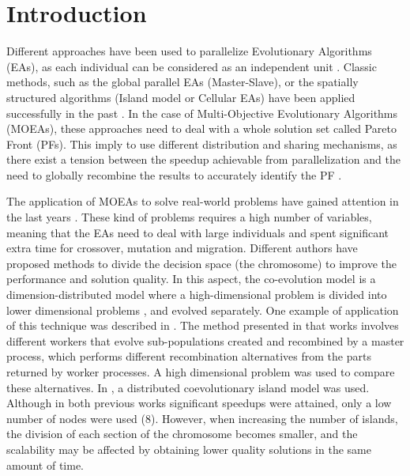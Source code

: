 \documentclass[Afour,sageh,times]{sagej}
\begin{document}

\maketitle

\section{Introduction}

Different approaches have been used to parallelize Evolutionary Algorithms (EAs), as each individual can be considered as an independent unit \citep{Alba13parallel}. Classic methods, such as the global parallel EAs (Master-Slave), or the spatially structured algorithms (Island model or Cellular EAs) have been applied successfully in the past \citep{Folino03cellular,Alba02Parallelism}.  In the case of Multi-Objective Evolutionary Algorithms (MOEAs), these approaches \citep{Luna15Survey} need to deal with a whole solution set called Pareto Front (PFs). This imply to use different distribution and sharing mechanisms, as there exist a tension between the speedup achievable from parallelization and the need to globally recombine the results to accurately identify the PF \citep{Branke04Parallelizingcone}.


The application of MOEAs to solve real-world problems have gained attention in the last years \citep{Luna15Survey,Mukhopadhyay14Survey,Chavez15MO,Hidalgo16residualstress}. These kind of problems requires a high number of variables, meaning that the EAs need to deal with large individuals and spent significant extra time for crossover, mutation and migration. Different authors have proposed methods to divide the decision space (the chromosome) to improve the performance and solution quality. In this aspect, the co-evolution model is a dimension-distributed model where a high-dimensional problem is divided into lower dimensional problems \citep{Gong15models,Tonda12cooperative}, and evolved separately. One example of application of this technique was described in \citep{Kimovski15Parallel}. The method presented in that works involves different workers that evolve sub-populations created and recombined by a master process, which performs different recombination alternatives from the parts returned by worker processes. A high dimensional problem was used to compare these
alternatives. In \citep{Dorronsoro13superlinear}, a distributed coevolutionary island model was used.  Although in both previous works significant speedups were attained, only a low number of nodes were used (8). However, when increasing the number of islands, the division of each section of the chromosome becomes smaller, and the scalability may be affected by obtaining lower quality solutions in the same amount of time.
\end{document}
